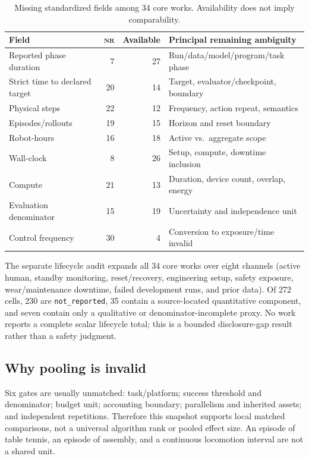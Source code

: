 \documentclass[11pt]{article}
\newcommand{\NR}{\textsc{nr}}
\begin{document}
\begin{table}[ht]
\centering
\caption{Missing standardized fields among 34 core works. Availability does not imply comparability.}
\label{tab:missing}
\begin{tabular}{lrrl}
\toprule
Field & \NR & Available & Principal remaining ambiguity \\
\midrule
Reported phase duration & 7 & 27 & Run/data/model/program/task phase \\
Strict time to declared target & 20 & 14 & Target, evaluator/checkpoint, boundary \\
Physical steps & 22 & 12 & Frequency, action repeat, semantics \\
Episodes/rollouts & 19 & 15 & Horizon and reset boundary \\
Robot-hours & 16 & 18 & Active vs.\ aggregate scope \\
Wall-clock & 8 & 26 & Setup, compute, downtime inclusion \\
Compute & 21 & 13 & Duration, device count, overlap, energy \\
Evaluation denominator & 15 & 19 & Uncertainty and independence unit \\
Control frequency & 30 & 4 & Conversion to exposure/time invalid \\
\bottomrule
\end{tabular}
\end{table}

The separate lifecycle audit expands all 34 core works over eight channels (active human, standby monitoring, reset/recovery, engineering setup, safety exposure, wear/maintenance downtime, failed development runs, and prior data). Of 272 cells, 230 are \texttt{not\_reported}, 35 contain a source-located quantitative component, and seven contain only a qualitative or denominator-incomplete proxy. No work reports a complete scalar lifecycle total; this is a bounded disclosure-gap result rather than a safety judgment.

\subsection{Why pooling is invalid}

Six gates are usually unmatched: task/platform; success threshold and denominator; budget unit; accounting boundary; parallelism and inherited assets; and independent repetitions. Therefore this snapshot supports local matched comparisons, not a universal algorithm rank or pooled effect size. An episode of table tennis, an episode of assembly, and a continuous locomotion interval are not a shared unit.
\end{document}
